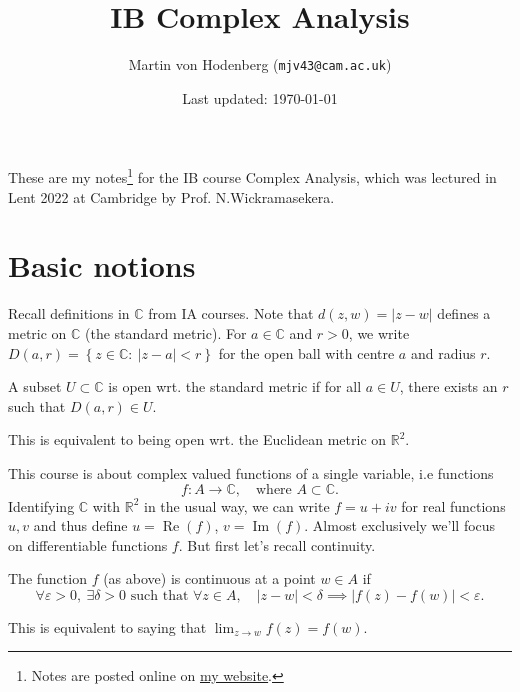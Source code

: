 \documentclass[egregdoesnotlikesansseriftitles,a4paper]{scrartcl}
\title{IB Complex Analysis}
\author{Martin von Hodenberg (\texttt{mjv43@cam.ac.uk})}
\date{Last updated: \today}
\begin{document}
\maketitle
These are my notes\footnote{Notes are posted online on \href{https://mjv43.user.srcf.net/}{my website}.} for the IB course Complex Analysis, which was lectured in Lent 2022 at Cambridge by Prof. N.Wickramasekera.
\newpage
\tableofcontents
\newpage

\section{Basic notions}
Recall definitions in $\mathbb{C}$ from IA courses. Note that $d (z,w)=|z-w|$ defines a metric on $\mathbb{C}$ (the standard metric). For $a \in \mathbb{C}$ and $r >0$, we write $D (a,r)= \left\{z \in \mathbb{C}: \ |z-a|<r \right\}$ for the open ball with centre $a$ and radius $r$. 
\begin{definition*}
     A subset $U \subset \mathbb{C}$ is open wrt. the standard metric if for all $a \in U$, there exists an $r$ such that $D (a,r) \in U$.
\end{definition*} 
\begin{remark}
     This is equivalent to being open wrt. the Euclidean metric on $\mathbb{R}^{2} $.
\end{remark}

This course is about complex valued functions of a single variable, i.e functions \[
f: A \rightarrow \mathbb{C}, \quad \text{where } A \subset \mathbb{C}
.\] 
Identifying $\mathbb{C}$ with $\mathbb{R}^2$ in the usual way, we can write $f=u+iv$ for real functions $u,v$ and thus define $u= \operatorname{Re} (f)$, $v=\operatorname{Im} (f)$. 
Almost exclusively we'll focus on differentiable functions $f$. But first let's recall continuity. 
\begin{definition*}
     The function $f$ (as above) is continuous at a point $w \in A$ if \[
     \forall \varepsilon >0, \ \exists \delta >0 \text{ such that } \forall z \in A,\quad  |z-w|<\delta \implies |f (z)- f (w)| <\varepsilon
     .\] 
\end{definition*}
\begin{remark}
     This is equivalent to saying that $\lim_{z \rightarrow w} f(z)=f (w) $. 
\end{remark}
\end{document}
